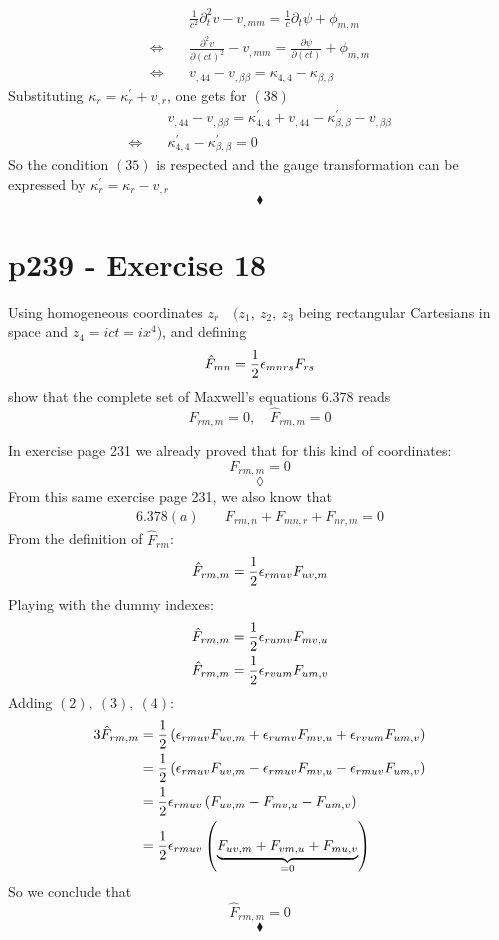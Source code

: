 \begin{align}
&\frac{1}{c^2}\partial^2_t v - v_{,mm}= \frac{1}{c}\partial_t\psi + \phi_{m,m}\\
\Leftrightarrow\quad &\frac{\partial^2 v}{\partial (ct)^2} - v_{,mm}= \frac{\partial \psi}{\partial (ct)} + \phi_{m,m}\\
\Leftrightarrow\quad & v_{,44} - v_{,\beta\beta}=  \kappa_{4,4} - \kappa_{\beta,\beta}
\end{align}
Substituting $\kappa_r= \kappa^{'}_r+v_{,r}$, one gets for $(38)$
\begin{align}
&v_{,44} - v_{,\beta\beta}=  \kappa^{'}_{4,4} +v_{,44} - \kappa^{'}_{\beta,\beta}-v_{,\beta\beta}\\
\Leftrightarrow\quad &\kappa^{'}_{4,4}- \kappa^{'}_{\beta,\beta}=0
\end{align}
So the condition $(35)$ is respected and the gauge transformation  can be expressed by $ \kappa^{'}_r= \kappa_r-v_{,r}$
$$\blacklozenge$$
\newpage



\section{p239 - Exercise 18}
\begin{tcolorbox}
Using homogeneous coordinates $z_r\quad (z_1,\ z_2,\ z_3$ being rectangular Cartesians in space and $z_4=ict=ix^4)$, and defining 
$$\hat{F}_{mn}= \frac{1}{2}\epsilon_{mnrs}F_{rs}$$
show that the complete set of Maxwell's equations $\mathbf{6.378}$ reads
$$F_{rm,m}=0,\quad \hat{F}_{rm,m}=0$$
\end{tcolorbox}
In exercise  page 231 we already proved that for this kind of coordinates:
$$F_{rm,m}=0$$ 
$$\lozenge$$
From this same exercise page 231, we also know that
\begin{align}
\mathbf{6.378}(a)\quad &F_{rm,n}+ F_{mn,r}+F_{nr,m}=0 
\end{align}
From the definition of $\hat{F}_{rm}$: 
\begin{align}
\hat{F}_{rm,m}= \frac{1}{2}\epsilon_{rmuv}F_{uv,m}
\end{align}
Playing with the dummy indexes:
\begin{align}
\hat{F}_{rm,m}= \frac{1}{2}\epsilon_{rumv}F_{mv,u}\\
\hat{F}_{rm,m}= \frac{1}{2}\epsilon_{rvum}F_{um,v}
\end{align}
Adding $(2),\ (3),\ (4)$:
\begin{align}
3\hat{F}_{rm,m}&= \frac{1}{2}\left(\epsilon_{rmuv}F_{uv,m} +\epsilon_{rumv}F_{mv,u} +\epsilon_{rvum}F_{um,v}\right)\\
&=\frac{1}{2}\left(\epsilon_{rmuv}F_{uv,m} -\epsilon_{rmuv}F_{mv,u} -\epsilon_{rmuv}F_{um,v}\right)\\
&=\frac{1}{2}\epsilon_{rmuv}\left(F_{uv,m} -F_{mv,u} -F_{um,v}\right)\\
&=\frac{1}{2}\epsilon_{rmuv}\left(\underbrace{F_{uv,m} +F_{vm,u} +F_{mu,v}}_{=0}\right)
\end{align}
So we conclude that $$\hat{F}_{rm,m}=0$$
$$\blacklozenge$$
\newpage
